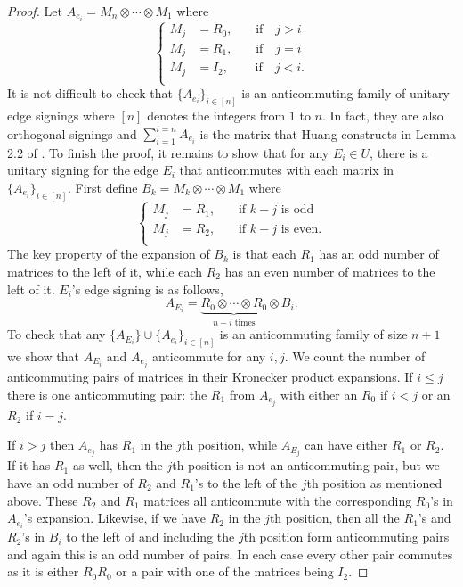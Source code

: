 \documentclass[11pt]{article}
\begin{document}
\begin{proof}
    Let $A_{e_i} = M_n \otimes \cdots \otimes M_1$ where 
\[
\begin{cases}
    M_j &= R_0,  \quad \; \; \; \text{if} \quad j > i\\
    M_j &= R_1,  \quad \; \; \; \text{if} \quad j = i\\
    M_j &= I_2,  \quad \; \; \; \; \text{if} \quad j < i.\\
\end{cases}
\]
It is not difficult to check 
that $\{A_{e_i}\}_{i \in [n]}$ is an anticommuting 
family of unitary edge signings where $[n]$ denotes the integers from $1$ to $n$. 
In fact, they are also orthogonal signings and $\sum_{i=1}^{i=n} A_{e_i}$ is the matrix that Huang 
constructs in Lemma 2.2 of \cite{Hu}. To finish the proof, 
it remains to show that for any $E_i \in U$, there is a unitary signing 
for the edge $E_i$ that anticommutes with each matrix 
in $\{A_{e_i}\}_{i \in [n]}$. 
First define $B_k = M_k \otimes \cdots \otimes M_1$ where  
\[
\begin{cases}
    M_j &= R_1,  \quad \; \; \; \text{if $k-j$ is odd} \\
    M_j &= R_2,  \quad \; \; \; \text{if $k-j$ is even.} \\
\end{cases}
\]
The key property of the expansion of $B_k$ is that each $R_1$ 
has an odd number of matrices to the left of it, while each 
$R_2$ has an even number of matrices to the left of it. 
$E_i$'s edge signing is as follows, 
\[
A_{E_i} = 
\underbrace{R_0 \otimes \cdots 
\otimes R_0}_{n - i \text{ times}} \otimes B_i.
\] 
To check that any $\{A_{E_i}\} \cup \{A_{e_i}\}_{i \in [n]}$ 
is an anticommuting family of size $n+1$ we show that $A_{E_i}$ 
and $A_{e_j}$ anticommute for any $i, j$. We count the 
number of anticommuting pairs of matrices in their Kronecker 
product expansions. If $i \leq j$ there is one 
anticommuting pair: the $R_1$ 
from $A_{e_j}$ with either an $R_0$ if $i<j$ or an $R_2$ if $i = j$. 

If $i > j$ then $A_{e_j}$ has $R_1$ in the $j$th position, 
while $A_{E_j}$ can have either $R_1$ or $R_2$. If it 
has $R_1$ as well, then the $j$th position is not an 
anticommuting pair, but we have an odd number of $R_2$ and $R_1$'s 
to the left of the $j$th position as mentioned above. 
These $R_2$ and $R_1$ matrices all anticommute with the 
corresponding $R_0$'s in $A_{e_i}$'s expansion. 
Likewise, if we have $R_2$ in the $j$th position, then all the 
$R_1$'s and $R_2$'s in $B_i$ to the left of and including the 
$j$th position form anticommuting pairs and again this is an odd 
number of pairs. In each case every other pair commutes as 
it is either $R_0R_0$ or a pair with one of the matrices being $I_2$.
\end{proof}
\end{document}
